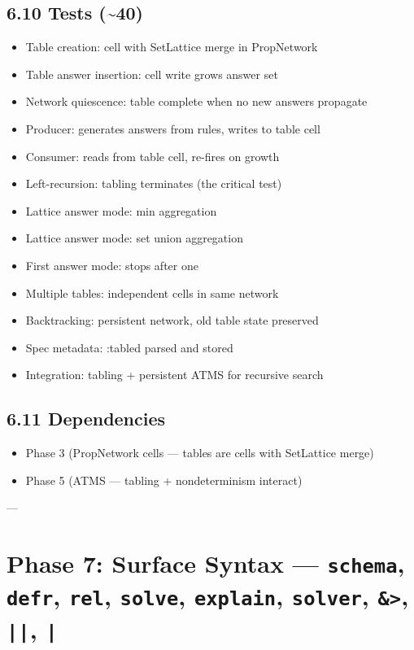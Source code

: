 \documentclass[11pt]{article}
\begin{document}
\subsection{6.10 Tests (\textasciitilde{}40)}
\label{sec:org869af83}

\begin{itemize}
\item Table creation: cell with SetLattice merge in PropNetwork
\item Table answer insertion: cell write grows answer set
\item Network quiescence: table complete when no new answers propagate
\item Producer: generates answers from rules, writes to table cell
\item Consumer: reads from table cell, re-fires on growth
\item Left-recursion: tabling terminates (the critical test)
\item Lattice answer mode: min aggregation
\item Lattice answer mode: set union aggregation
\item First answer mode: stops after one
\item Multiple tables: independent cells in same network
\item Backtracking: persistent network, old table state preserved
\item Spec metadata: :tabled parsed and stored
\item Integration: tabling + persistent ATMS for recursive search
\end{itemize}
\subsection{6.11 Dependencies}
\label{sec:org2391feb}

\begin{itemize}
\item Phase 3 (PropNetwork cells — tables are cells with SetLattice merge)
\item Phase 5 (ATMS — tabling + nondeterminism interact)
\end{itemize}

---
\section{Phase 7: Surface Syntax — \texttt{schema}, \texttt{defr}, \texttt{rel}, \texttt{solve}, \texttt{explain}, \texttt{solver}, \texttt{\&>}, \texttt{||}, \texttt{|}}
\label{sec:org8f9d677}
\end{document}
